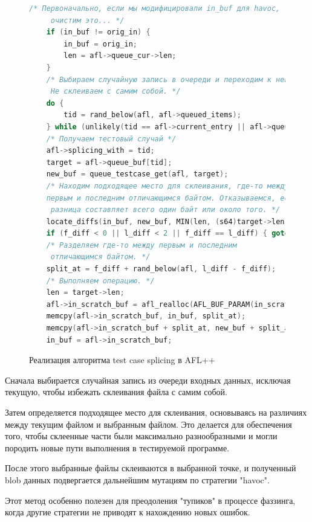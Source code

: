 \begin{figure}[ht]
	\begin{lstlisting}[language=C]
	/* Первоначально, если мы модифицировали in_buf для havoc,
	 очистим это... */
	if (in_buf != orig_in) {
		in_buf = orig_in;
		len = afl->queue_cur->len;
	}
	/* Выбираем случайную запись в очереди и переходим к ней.
	 Не склеиваем с самим собой. */
	do {
		tid = rand_below(afl, afl->queued_items);
	} while (unlikely(tid == afl->current_entry || afl->queue_buf[tid]->len < 4));
	/* Получаем тестовый случай */
	afl->splicing_with = tid;
	target = afl->queue_buf[tid];
	new_buf = queue_testcase_get(afl, target);
	/* Находим подходящее место для склеивания, где-то между 
	первым и последним отличающимся байтом.	Отказываемся, если
	 разница составляет всего один байт или около того. */
	locate_diffs(in_buf, new_buf, MIN(len, (s64)target->len), &f_diff, &l_diff);
	if (f_diff < 0 || l_diff < 2 || f_diff == l_diff) { goto retry_splicing; }
	/* Разделяем где-то между первым и последним
	 отличающимся байтом. */
	split_at = f_diff + rand_below(afl, l_diff - f_diff);
	/* Выполняем операцию. */
	len = target->len;
	afl->in_scratch_buf = afl_realloc(AFL_BUF_PARAM(in_scratch), len);
	memcpy(afl->in_scratch_buf, in_buf, split_at);
	memcpy(afl->in_scratch_buf + split_at, new_buf + split_at, len - split_at);
	in_buf = afl->in_scratch_buf;
	\end{lstlisting}
	\caption{Реализация алгоритма test case splicing в AFL++}\label{fig:test-case-splicing}
\end{figure}

\newpage
Сначала выбирается случайная запись из очереди входных данных, исключая текущую, чтобы избежать склеивания файла с самим собой.

Затем определяется подходящее место для склеивания, основываясь на различиях между текущим файлом и выбранным файлом. Это делается для обеспечения того, чтобы склеенные части были максимально разнообразными и могли породить новые пути выполнения в тестируемой программе.

После этого выбранные файлы склеиваются в выбранной точке, и полученный blob данных подвергается дальнейшим мутациям по стратегии "havoc".

Этот метод особенно полезен для преодоления "тупиков" в процессе фаззинга, когда другие стратегии не приводят к нахождению новых ошибок.


%


%
